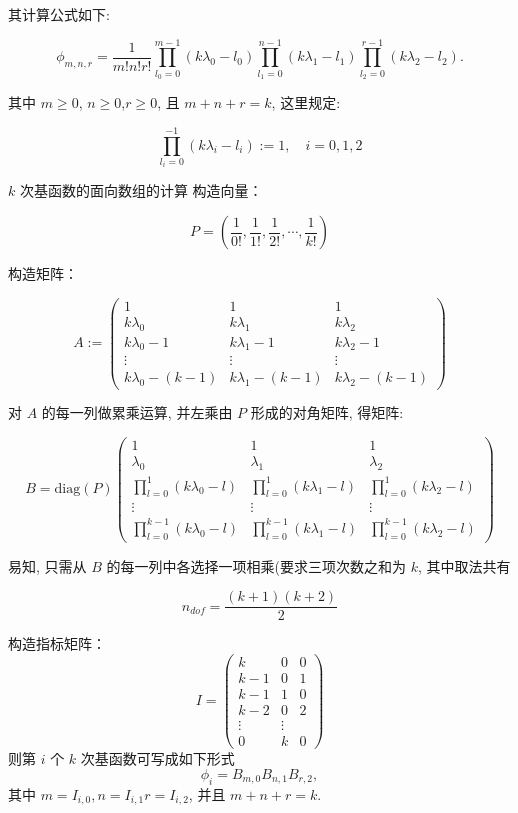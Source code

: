 \documentclass{article}
\begin{document}
其计算公式如下:

\[
\phi_{m,n,r} = \frac{1}{m!n!r!}\prod_{l_0 = 0}^{m - 1}
(k\lambda_0 - l_0) \prod_{l_1 = 0}^{n-1}(k\lambda_1 -
l_1)\prod_{l_2 = 0}^{r-1}(k\lambda_2 -
l_2).
\]

其中 $ m\geq 0$, $ n\geq 0 $,$ r\geq 0 $, 且 $ m+n+r=k $, 这里规定:

\[
 \prod_{l_i=0}^{-1}(k\lambda_i - l_i) := 1,\quad i=0, 1, 2
\]

$k$ 次基函数的面向数组的计算
构造向量： 

\[
P = ( \frac{1}{0!},  \frac{1}{1!}, \frac{1}{2!}, \cdots, \frac{1}{k!})
\]

构造矩阵： 

\[
A :=
\begin{pmatrix}
1  &  1  &  1 \\
k\lambda_0 & k\lambda_1  & k\lambda_2\\
k\lambda_0 - 1 & k\lambda_1 - 1 & k\lambda_2 - 1\\
\vdots & \vdots  & \vdots\\
k\lambda_0 - (k - 1) & k\lambda_1 - (k - 1) & k\lambda_2 - (k - 1)
\end{pmatrix}
\]

对 $A$ 的每一列做累乘运算, 并左乘由 $P$ 形成的对角矩阵, 得矩阵:

\[
B = \mathrm{diag}(P)
\begin{pmatrix}
1 & 1 & 1\\
\lambda_0 & \lambda_1 & \lambda_2\\
\prod_{l=0}^{1}(k\lambda_0 - l) & \prod_{l=0}^{1}(k\lambda_1 - l) & \prod_{l=0}^{1}(k\lambda_2 - l)\\
\vdots & \vdots & \vdots\\
\prod_{l=0}^{k-1}(k\lambda_0 - l) & \prod_{l=0}^{k-1}(k\lambda_1 - l)  & \prod_{l=0}^{k-1}(k\lambda_2 - l)
\end{pmatrix}
\]

易知, 只需从 $B$ 的每一列中各选择一项相乘(要求三项次数之和为 $k$,
其中取法共有

\[
n_{dof} = \frac{(k+1)(k+2)}{2}
\]

构造指标矩阵：
\[
I = \begin{pmatrix}
k  & 0 & 0\\ k-1 & 0 & 1 \\ k-1 & 1 & 0 \\ k-2 & 0 & 2 \\ \vdots & \vdots \\ 0 & k & 0
\end{pmatrix}
\]
则第 $i$ 个 $k$ 次基函数可写成如下形式
\[
\phi_i = B_{m,0}B_{n,1}B_{r,2}, 
\]
其中 $ m = I_{i, 0}, n = I_{i, 1}  r = I_{i, 2}$, 并且 $ m + n + r = k$.
\end{document}
